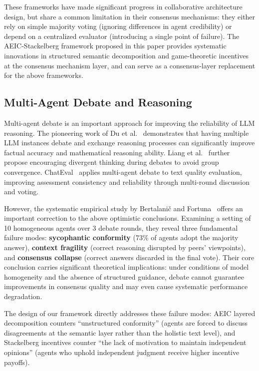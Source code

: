 \documentclass[12pt,a4paper]{article}
\begin{document}
These frameworks have made significant progress in collaborative architecture design, but share a common limitation in their consensus mechanisms: they either rely on simple majority voting (ignoring differences in agent credibility) or depend on a centralized evaluator (introducing a single point of failure). The AEIC-Stackelberg framework proposed in this paper provides systematic innovations in structured semantic decomposition and game-theoretic incentives at the consensus mechanism layer, and can serve as a consensus-layer replacement for the above frameworks.

\subsection{Multi-Agent Debate and Reasoning}

Multi-agent debate is an important approach for improving the reliability of LLM reasoning. The pioneering work of Du et al.~\cite{du2023improving} demonstrates that having multiple LLM instances debate and exchange reasoning processes can significantly improve factual accuracy and mathematical reasoning ability. Liang et al.~\cite{liang2023encouraging} further propose encouraging divergent thinking during debates to avoid group convergence. ChatEval~\cite{chan2023chateval} applies multi-agent debate to text quality evaluation, improving assessment consistency and reliability through multi-round discussion and voting.

However, the systematic empirical study by Bertalani\v{c} and Fortuna~\cite{bertalanic2026cost} offers an important correction to the above optimistic conclusions. Examining a setting of 10 homogeneous agents over 3 debate rounds, they reveal three fundamental failure modes: \textbf{sycophantic conformity} (73\% of agents adopt the majority answer), \textbf{context fragility} (correct reasoning disrupted by peers' viewpoints), and \textbf{consensus collapse} (correct answers discarded in the final vote). Their core conclusion carries significant theoretical implications: under conditions of model homogeneity and the absence of structured guidance, debate cannot guarantee improvements in consensus quality and may even cause systematic performance degradation.

The design of our framework directly addresses these failure modes: AEIC layered decomposition counters ``unstructured conformity'' (agents are forced to discuss disagreements at the semantic layer rather than the holistic text level), and Stackelberg incentives counter ``the lack of motivation to maintain independent opinions'' (agents who uphold independent judgment receive higher incentive payoffs).
\end{document}
